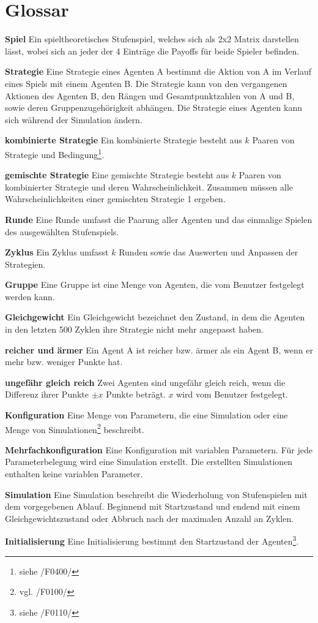 \section{Glossar}

\textbf{Spiel}
Ein spieltheoretisches Stufenspiel, welches sich als 2x2 Matrix darstellen lässt, wobei sich an jeder der 4 Einträge die Payoffs für beide Spieler befinden.

\textbf{Strategie}
Eine Strategie eines Agenten A bestimmt die Aktion von A im Verlauf eines Spiels mit einem Agenten B. Die Strategie kann von den vergangenen Aktionen des Agenten B, den Rängen und Gesamtpunktzahlen von A und B, sowie deren Gruppenzugehörigkeit abhängen. Die Strategie eines Agenten kann sich während der Simulation ändern.

\textbf{kombinierte Strategie}
Ein kombinierte Strategie besteht aus $k$ Paaren von Strategie und Bedingung\footnote{siehe /F0400/}. 

\textbf{gemischte Strategie}
Eine gemischte Strategie besteht aus $k$ Paaren von kombinierter Strategie und deren Wahrscheinlichkeit. Zusammen müssen alle Wahrscheinlichkeiten einer gemischten Strategie 1 ergeben.

\textbf{Runde}
Eine Runde umfasst die Paarung aller Agenten und das einmalige Spielen des ausgewählten Stufenspiels.

\textbf{Zyklus}
Ein Zyklus umfasst $k$ Runden sowie das Auswerten und Anpassen der Strategien.

\textbf{Gruppe}
Eine Gruppe ist eine Menge von Agenten, die vom Benutzer festgelegt werden kann.

\textbf{Gleichgewicht}
Ein Gleichgewicht bezeichnet den Zustand, in dem die Agenten in den letzten 500 Zyklen ihre Strategie nicht mehr angepasst haben.

\textbf{reicher und ärmer}
Ein Agent A ist reicher bzw. ärmer als ein Agent B, wenn er mehr bzw. weniger Punkte hat.

\textbf{ungefähr gleich reich}
Zwei Agenten sind ungefähr gleich reich, wenn die Differenz ihrer Punkte $\pm x$ Punkte beträgt. $x$ wird vom Benutzer festgelegt. 

\textbf{Konfiguration}
Eine Menge von Parametern, die eine Simulation oder eine Menge von Simulationen\footnote{vgl. /F0100/} beschreibt.

{\color{red}\textbf{Mehrfachkonfiguration}
Eine Konfiguration mit variablen Parametern. Für jede Parameterbelegung wird eine Simulation erstellt. Die erstellten Simulationen enthalten keine variablen Parameter.}

\textbf{Simulation}
Eine Simulation beschreibt die Wiederholung von Stufenspielen mit dem vorgegebenen Ablauf. Beginnend mit Startzustand und endend mit einem Gleichgewichtszustand oder Abbruch nach der maximalen Anzahl an Zyklen.

\textbf{Initialisierung}
Eine Initialisierung bestimmt den Startzustand der Agenten\footnote{siehe /F0110/}.